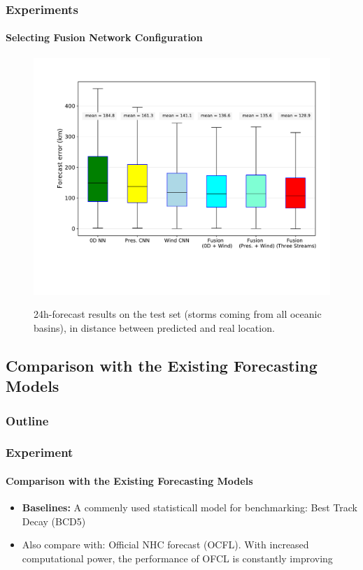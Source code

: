 \documentclass{beamer}
\begin{document}
\begin{frame}
\frametitle{Experiments}
\framesubtitle{Selecting Fusion Network Configuration}
\begin{figure}
	\caption{24h-forecast results on the test set (storms coming from all oceanic basins), in distance between predicted and real location.}
	\includegraphics[width=0.75\linewidth]{figs/MAE.pdf} \\
\end{figure}

\end{frame}


\subsection{Comparison with the Existing Forecasting Models}
\begin{frame}
\frametitle{Outline} %
\tableofcontents[currentsubsection] %
\end{frame}

\begin{frame}
\frametitle{Experiment} 
\framesubtitle{Comparison with the Existing Forecasting Models}
\begin{itemize}
	\item \textbf{Baselines:} A commenly used statisticall model for benchmarking:  Best Track Decay (BCD5)
	\item Also compare with: Official NHC forecast (OCFL). With increased computational power, the performance of OFCL is constantly improving
	
\end{itemize}
\end{frame}
\end{document}
